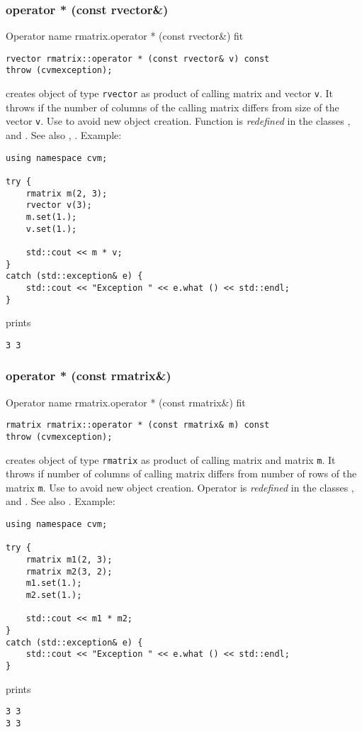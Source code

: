 \subsubsection{operator * (const rvector\&)}
Operator%
\pdfdest name {rmatrix.operator * (const rvector&)} fit
\begin{verbatim}
rvector rmatrix::operator * (const rvector& v) const
throw (cvmexception);
\end{verbatim}
creates  object of type \verb"rvector"
as  product of  calling matrix and  vector \verb"v".
It throws  
if the number of columns of the calling matrix
differs from size of the vector \verb"v".
Use 
to avoid new object creation.
Function is \emph{redefined} in the classes
, 
and .
See also
, .
Example:
\begin{Verbatim}
using namespace cvm;

try {
    rmatrix m(2, 3);
    rvector v(3);
    m.set(1.);
    v.set(1.);

    std::cout << m * v;
}
catch (std::exception& e) {
    std::cout << "Exception " << e.what () << std::endl;
}
\end{Verbatim}
prints
\begin{Verbatim}
3 3
\end{Verbatim}
\newpage



\subsubsection{operator * (const rmatrix\&)}
Operator%
\pdfdest name {rmatrix.operator * (const rmatrix&)} fit
\begin{verbatim}
rmatrix rmatrix::operator * (const rmatrix& m) const
throw (cvmexception);
\end{verbatim}
creates  object of type \verb"rmatrix"
as  product of  calling matrix and  matrix \verb"m".
It throws  
if  number of columns of  calling matrix
differs from  number of rows of the matrix \verb"m".
Use  to avoid new object creation.
Operator is \emph{redefined} in the classes
, 
and .
See also
.
Example:
\begin{Verbatim}
using namespace cvm;

try {
    rmatrix m1(2, 3);
    rmatrix m2(3, 2);
    m1.set(1.);
    m2.set(1.);

    std::cout << m1 * m2;
}
catch (std::exception& e) {
    std::cout << "Exception " << e.what () << std::endl;
}
\end{Verbatim}
prints
\begin{Verbatim}
3 3
3 3
\end{Verbatim}
\newpage



